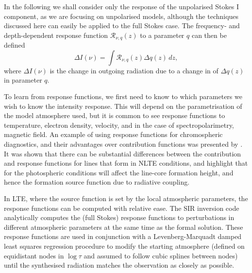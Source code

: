 In the following we shall consider only the response of the unpolarised Stokes I component, as we are focusing on unpolarised models, although the techniques discussed here can easily be applied to the full Stokes case.
The frequency- and depth-dependent response function $\mathcal{R}_{\nu, q} (z)$ to a parameter $q$ can then be defined
\begin{equation}
    \Delta I(\nu) = \int\mathcal{R}_{\nu, q}(z) \Delta q(z)\,dz,
\end{equation}
where $\Delta I(\nu)$ is the change in outgoing radiation due to a change in of $\Delta q(z)$ in parameter $q$.


To learn from response functions, we first need to know to which parameters we wish to know the intensity response.
This will depend on the parametrisation of the model atmosphere used, but it is common to see response functions to temperature, electron density, velocity, and in the case of spectropolarimetry, magnetic field.
An example of using response functions for chromospheric diagnostics, and their advantages over contribution functions was presented by \citet{Uitenbroek2006}.
It was shown that there can be substantial differences between the contribution and response functions for lines that form in NLTE conditions, and highlight that for \Ha{} the photospheric conditions will affect the line-core formation height, and hence the formation source function due to radiative coupling.

In LTE, where the source function is set by the local atmospheric parameters, the response functions can be computed with relative ease.
The SIR inversion code \citep{1992RuizCobo} analytically computes the (full Stokes) response functions to perturbations in different atmospheric parameters at the same time as the formal solution.
These response functions are used in conjunction with a Levenberg-Marquadt damped least squares regression procedure to modify the starting atmosphere (defined on equidistant nodes in $\log \tau$ and assumed to follow cubic splines between nodes) until the synthesised radiation matches the observation as closely as possible.


